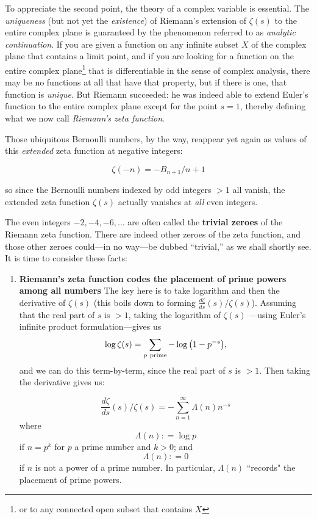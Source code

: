 \documentclass[openany]{book}
\theoremstyle{plain}
\theoremstyle{definition}
\begin{document}
{{To appreciate the second point, the theory of a complex variable is
essential. The {\it uniqueness} (but not yet the {\it existence}) of
Riemann's extension of $\zeta(s)$ to the entire complex plane is
guaranteed by the phenomenon referred to as {\it analytic
  continuation}.  If you are given a function on any infinite subset
$X$ of the complex plane that contains a limit point, and if you are
looking for a function on the entire complex plane{\footnote{ or to
    any connected open subset that contains $X$}} that is
differentiable in the sense of complex analysis, there may be no
functions at all that have that property, but if there is one, that
function is {\it unique}.  But Riemann succeeded: he was indeed able
to extend Euler's function to the entire complex plane except for the
point $s=1$, thereby defining what we now call {\it Riemann's zeta
  function}.  \vskip20pt

 Those ubiquitous Bernoulli numbers, by the way, reappear yet again as
 values of this {\it extended} zeta function at negative integers:

  $$\zeta(-n) = -B_{n+1}/n+1$$

  so since the Bernoulli numbers indexed by odd integers $>1$ all
  vanish, the extended zeta function $\zeta(s)$ actually vanishes at
  {\it all} even integers.

  The even integers $-2, -4, -6, \dots$ are often called the {\bf
    trivial zeroes} of the Riemann zeta function.  There are indeed
  other zeroes of the zeta function, and those other zeroes could---in no way---be
  dubbed ``trivial,'' as we shall shortly see.\vskip20pt It is time to
  consider these facts:

  \begin{enumerate}\item {\bf Riemann's zeta function codes the
      placement of prime powers among all numbers} The key here is to
    take logarithm and then the derivative of $\zeta(s)$ (this boils
    down to forming ${\frac{d{\zeta}}{ds}}(s)/\zeta(s)$). Assuming
    that the real part of $s$ is $>1$, taking the logarithm of
    $\zeta(s)$ ---using Euler's infinite product formulation---gives
    us $$\log\zeta(s)= \sum_{p \ {\rm
        prime}}-\log{\big(1-p^{-s}\big)},$$ and we can do this
    term-by-term, since the real part of $s$ is $>1$.  Then taking the
    derivative gives us:

  \vskip20pt
   $${\frac{d{\zeta}}{ds}}(s)/\zeta(s)= -\sum_{n=1}^{\infty}\Lambda(n)n^{-s}$$ where  $$\Lambda(n): = \log p$$ if $n= p^k$ for $p$ a prime number and $k >0$;  and  $$\Lambda(n): = 0$$ if $n$ is not a power of a prime number.  In particular,  $\Lambda(n)$ ``records" the placement of prime powers.


\end{enumerate}}}
\end{document}
